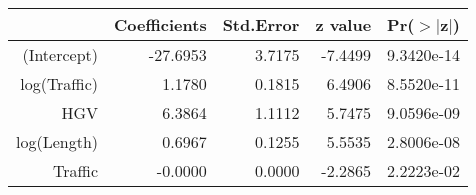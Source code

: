 \begin{table}[ht]
\centering
\begin{tabular}{rrrrr}
  \hline
 & Coefficients & Std.Error & z value & Pr($>$$|$z$|$) \\ 
  \hline
(Intercept) & -27.6953 & 3.7175 & -7.4499 & 9.3420e-14 \\ 
  log(Traffic) & 1.1780 & 0.1815 & 6.4906 & 8.5520e-11 \\ 
  HGV & 6.3864 & 1.1112 & 5.7475 & 9.0596e-09 \\ 
  log(Length) & 0.6967 & 0.1255 & 5.5535 & 2.8006e-08 \\ 
  Traffic & -0.0000 & 0.0000 & -2.2865 & 2.2223e-02 \\ 
   \hline
\end{tabular}
\end{table}
